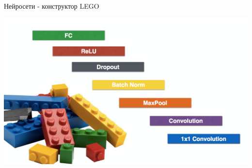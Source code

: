 \documentclass[notes,12pt, aspectratio=169]{beamer}
\begin{document}
\begin{frame}{Нейросети -  конструктор LEGO}
\begin{center}
	\includegraphics[width=0.8\paperwidth]{lego_lego.png}
\end{center}
\end{frame}
\end{document}
